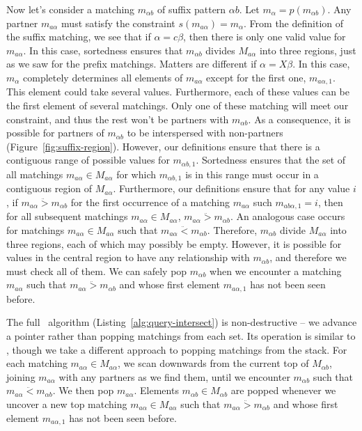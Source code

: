 Now let's consider a matching $m_{\alpha{}b}$ of suffix
pattern $\alpha{}b$.  Let $m_\alpha = p(m_{\alpha{}b})$.
Any partner $m_{a\alpha}$ must satisfy the constraint
$s(m_{a\alpha}) = m_\alpha$.  From the definition of
the suffix matching, we see that if $\alpha = c\beta$,
then there is only one valid value for $m_{a\alpha}$.  In
this case, sortedness ensures that $m_{\alpha{}b}$
divides $M_{a\alpha}$ into three regions, just as we
saw for the prefix matchings.  Matters are different
if $\alpha = X\beta$.  In this case, $m_\alpha$
completely determines all elements of $m_{a\alpha}$
except for the first one, $m_{a\alpha,1}$.  This element
could take several values.  Furthermore, each of these values 
can be the first element of several matchings.  Only one of
these matching will meet our constraint, and thus
the rest won't be partners with $m_{\alpha{}b}$.  As a consequence,
it is possible for partners of $m_{\alpha{}b}$ to be 
interspersed with non-partners (Figure~\ref{fig:suffix-region}).
However, our definitions ensure that there is a contiguous 
range of possible values for $m_{\alpha{}b,1}$.
Sortedness ensures that the set of all matchings 
$m_{a\alpha} \in M_{a\alpha}$ for which $m_{\alpha{}b,1}$ is in this
range must occur in a contiguous region of $M_{a\alpha}$.
Furthermore, our definitions ensure that for any 
value $i$, if $m_{a\alpha} \ddot{>} m_{\alpha{}b}$ for the first occurrence
of a matching $m_{a\alpha}$ such $m_{ab\alpha,1} = i$,
then for all subsequent matchings $m_{a\alpha} \in M_{a\alpha}$,
$m_{a\alpha} \ddot{>} m_{\alpha{}b}$.  An analogous case
occurs for matchings $m_{a\alpha} \in M_{a\alpha}$ such that
$m_{a\alpha} \ddot{<} m_{\alpha{}b}$.  Therefore, $m_{\alpha{}b}$
divide $M_{a\alpha}$ into three regions, each of which may
possibly be empty.  However, it is possible for values in
the central region to have any relationship with $m_{\alpha{}b}$,
and therefore we must check all of them.  We can safely
pop $m_{\alpha{}b}$ when we encounter a matching
$m_{a\alpha}$ such that $m_{a\alpha} \ddot{>} m_{\alpha{}b}$ and
whose first element $m_{a\alpha,1}$ has not been seen before.



The full \queryfunc\ algorithm (Listing~\ref{alg:query-intersect}) is non-destructive -- we
advance a pointer rather than popping matchings from each set.  Its operation is
similar to \intersectfunc, though we take a different approach to popping matchings
from the stack.  For each matching $m_{a\alpha} \in M_{a\alpha}$, we scan 
downwards from the current top of $M_{\alpha{}b}$, joining $m_{a\alpha}$ with any
partners as we find them, until we encounter $m_{\alpha{}b}$ such that
$m_{a\alpha} \ddot{<} m_{\alpha{}b}$.  We then pop $m_{a\alpha}$.  Elements
$m_{\alpha{}b} \in M_{\alpha{}b}$ are popped whenever we uncover a new
top matching $m_{a\alpha} \in M_{a\alpha}$ such that 
$m_{a\alpha} \ddot{>} m_{\alpha{}b}$ and whose first element $m_{a\alpha,1}$
has not been seen before.  

